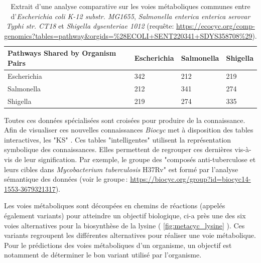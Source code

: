 \begin{refsegment}
    \begin{table}[H]
    	\caption{Extrait d'une analyse comparative sur les voies métaboliques communes entre d'\textit{Escherichia coli K-12 substr. MG1655}, \textit{Salmonella enterica enterica serovar Typhi str. CT18} et \textit{Shigella dysenteriae 1012} (requête: \url{https://ecocyc.org/comp-genomics?tables=pathway&orgids=\%28ECOLI+SENT220341+SDYS358708\%29}). }
    	\label{tab:compare_tools} 
    	\begin{tabular}{l|lll}
    		\toprule
    		Pathways Shared by Organism Pairs & Escherichia & Salmonella & Shigella \\
    		\midrule
    		Escherichia                       & 342         & 212        & 219      \\           
    		Salmonella                        & 212         & 341        & 274      \\           
    		Shigella                          & 219         & 274        & 335      \\ 
    		\bottomrule
    	\end{tabular}
    \end{table}
    
    
    Toutes ces données spécialisées sont croisées pour produire de la connaissance. Afin de visualiser ces nouvelles connaissances \textit{Biocyc} met à disposition des tables interactives, les "\acrfull{KS}" \cite{bat061SmartTable}. Ces tables "intelligentes" utilisent la représentation symbolique des connaissances. Elles permettent de regrouper ces dernières vis-à-vis de leur signification. Par exemple, le groupe des "composés anti-tuberculose  et leurs cibles dans  \textit{Mycobacterium tuberculosis} H37Rv" est formé par l'analyse sémantique des données (voir le groupe : \url{https://biocyc.org/group?id=biocyc14-1553-3679321317}).
    
    Les voies métaboliques sont découpées en chemins de réactions (appelés également variants) pour atteindre un objectif biologique, ci-a près une des six voies alternatives pour la biosynthèse de la lysine ( \cref{fig:metacyc_lysine}  ). Ces variants regroupent les différentes alternatives pour réaliser une voie métabolique. Pour le prédictions des voies métaboliques d'un organisme, un objectif est notamment de déterminer le bon variant utilisé par l'organisme.
    

\end{refsegment}
